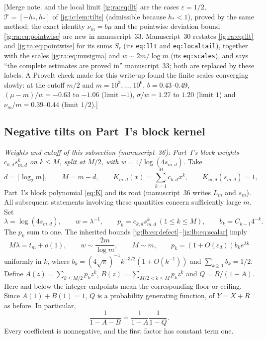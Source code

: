 \documentclass[11pt,a4paper]{article}
\theoremstyle{definition}\newaliascnt{definition}{theorem}
\theoremstyle{remark}\newaliascnt{remark}{theorem}
\newcommand{\eps}{\varepsilon}
\begin{document}
[Merge note.  and the local limit
\eqref{jg:ra:eq:llt} are the cases $\varepsilon=1/2$, $\mathcal T=[-h_*,h_*]$
of \cref{jg:ic:lem:tilts} (admissible because $h_*<1$), proved by the same
method; the exact identity $\nu_m=b\mu$ and the pointwise deviation bound
\eqref{jg:ra:eq:pointwise} are new in manuscript~33. Manuscript~30 restates
\eqref{jg:ra:eq:llt} and \eqref{jg:ra:eq:pointwise} for its sums
$S_\ell$ (its \texttt{eq:llt} and \texttt{eq:localtail}), together with the
scales \eqref{jg:ra:eq:musigma} and $w\sim2m/\log m$ (its \texttt{eq:scales}),
and says ``the complete estimates are proved in'' manuscript~33; both are
replaced by these labels. A ProveIt check made for this write-up found the
finite scales converging slowly: at the cutoff $m/2$ and $m=10^3,\ldots,10^6$,
$b=0.43$--$0.49$, $(\mu-m)/w=-0.63$ to $-1.06$ (limit $-1$), $\sigma/w=1.27$
to $1.20$ (limit $1$) and $\nu_m/m=0.39$--$0.44$ (limit $1/2$).]

\subsection{Negative tilts on Part~I's block kernel}
\label{jg:sec:llt-36}
\emph{Weights and cutoff of this subsection (manuscript~36): Part~I's block
weights $c_{k,d}s_{m,d}^k$ on $k\le M$, split at $M/2$, with
$w=1/\log(4s_{m,d})$.} Take
\begin{equation}\label{jg:lb:eq:lowerkernel}
 d=\lceil\log_2m\rceil,\qquad M=m-d,\qquad
 K_{m,d}(x)=\sum_{k=1}^Mc_{k,d}x^k,\qquad K_{m,d}(s_{m,d})=1,
\end{equation}
Part~I's block polynomial \eqref{eq:K} and its root (manuscript~36 writes
$L_m$ and $s_m$). All subsequent statements involving these quantities concern
sufficiently large $m$. Set
\begin{equation}\label{jg:lb:eq:scales}
 \lambda=\log(4s_{m,d}),\qquad w=\lambda^{-1},\qquad
 p_k=c_{k,d}s_{m,d}^k\ (1\le k\le M),\qquad
 b_k=C_{k-1}4^{-k}.
\end{equation}
The $p_k$ sum to one. The inherited bounds \eqref{jg:lb:eq:defect}--\eqref{jg:lb:eq:scalar} imply
\begin{equation}\label{jg:lb:eq:scaleas}
 M\lambda=t_m+o(1),\qquad w\sim\frac{2m}{\log m},\qquad M\sim m,
 \qquad
 p_k=(1+O(\eps_d))b_ke^{\lambda k}
\end{equation}
uniformly in $k$, where $b_k=(4\sqrt\pi)^{-1}k^{-3/2}(1+O(k^{-1}))$ and
$\sum_{k\ge1}b_k=1/2$. Define $A(z)=\sum_{k\le M/2}p_kz^k$,
$B(z)=\sum_{M/2<k\le M}p_kz^k$ and $Q=B/(1-A)$. Here and below the integer
endpoints mean the corresponding floor or ceiling. Since $A(1)+B(1)=1$, $Q$ is
a probability generating function, of $Y=X+R$ as before. In particular,
\begin{equation}\label{jg:lb:eq:renewalfactor}
 \frac1{1-A-B}=\frac1{1-A}\frac1{1-Q}.
\end{equation}
Every coefficient is nonnegative, and the first factor has constant term one.
\end{document}
